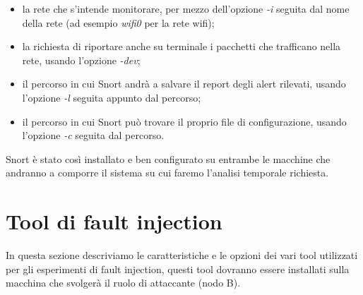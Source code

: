 \begin{itemize}
\begin{itemize}
		        \item la rete che s'intende monitorare, per mezzo dell'opzione \textit{-i} seguita dal nome della rete (ad esempio \textit{wifi0} per la rete wifi);
		        \item la richiesta di riportare anche su terminale i pacchetti che trafficano nella rete, usando l'opzione \textit{-dev};
		        \item il percorso in cui Snort andrà a salvare il report degli alert rilevati, usando l'opzione \textit{-l} seguita appunto dal percorso;
		        \item il percorso in cui Snort può trovare il proprio file di configurazione, usando l'opzione \textit{-c} seguita dal percorso.
		      \end{itemize}
		\end{itemize}
		
		Snort è stato così installato e ben configurato su entrambe le macchine che andranno a comporre il sistema su cui faremo l'analisi temporale richiesta.
		
	\section{Tool di fault injection}
	In questa sezione descriviamo le caratteristiche e le opzioni dei vari tool utilizzati per gli esperimenti di fault injection, questi tool dovranno essere installati sulla macchina che svolgerà il ruolo di attaccante (nodo B).
	
